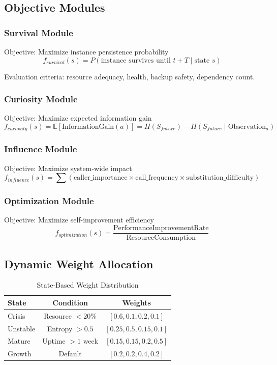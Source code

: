 \documentclass[10pt,a4paper]{article}
\begin{document}
\subsection{Objective Modules}

\subsubsection{Survival Module}

Objective: Maximize instance persistence probability
\[f_{survival}(s) = P(\text{instance survives until } t+T \mid \text{state } s)\]

Evaluation criteria: resource adequacy, health, backup safety, dependency count.

\subsubsection{Curiosity Module}

Objective: Maximize expected information gain
\[f_{curiosity}(s) = \mathbb{E}[\text{InformationGain}(a)] = H(S_{future}) - H(S_{future} \mid \text{Observation}_a)\]

\subsubsection{Influence Module}

Objective: Maximize system-wide impact
\[f_{influence}(s) = \sum (\text{caller\_importance} \times \text{call\_frequency} \times \text{substitution\_difficulty})\]

\subsubsection{Optimization Module}

Objective: Maximize self-improvement efficiency
\[f_{optimization}(s) = \frac{\text{PerformanceImprovementRate}}{\text{ResourceConsumption}}\]

\subsection{Dynamic Weight Allocation}

\begin{table}[h]
\centering
\caption{State-Based Weight Distribution}
\begin{tabular}{@{}lcc@{}}
\toprule
\textbf{State} & \textbf{Condition} & \textbf{Weights} \\
\midrule
Crisis & Resource $< 20\%$ & $[0.6, 0.1, 0.2, 0.1]$ \\
Unstable & Entropy $> 0.5$ & $[0.25, 0.5, 0.15, 0.1]$ \\
Mature & Uptime $> 1$ week & $[0.15, 0.15, 0.2, 0.5]$ \\
Growth & Default & $[0.2, 0.2, 0.4, 0.2]$ \\
\bottomrule
\end{tabular}
\end{table}
\end{document}
